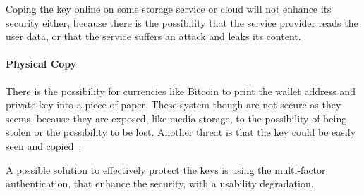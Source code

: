 Coping the key online on some storage service or cloud will not enhance its
security either, because there is the possibility that the service provider
reads the user data, or that the service suffers an attack and leaks its
content.

\paragraph{Physical Copy} There is the possibility for currencies like Bitcoin
to print the wallet address and private key into a piece of paper. These system
though are not secure as they seems, because they are exposed, like media
storage, to the possibility of being stolen or the possibility to be lost.
Another threat is that the key could be easily seen and
copied~\cite{eskandari15}.


A possible solution to effectively protect the keys is using the multi-factor
authentication, that enhance the security, with a usability degradation.

